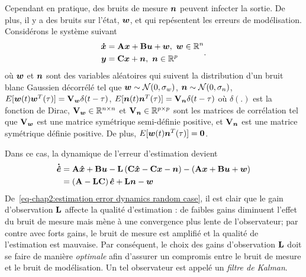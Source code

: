 Cependant en pratique, des bruits de mesure $\bm{n}$ peuvent infecter la sortie. De plus, il y a des bruits  sur l'état, $\bm{w}$,  et  qui repésentent les erreurs de modélisation. Considérons le système suivant
\begin{align}\label{eq-chap2:syslin_commande_noise}
	\begin{split}
		\stateDot &= \matriceA\state+\matriceB\command+\modelNoise, \ \modelNoise\inR^n\\
		\out &= \matriceC\state + \measureNoise, \ \measureNoise\inR^{p}
	\end{split}.
\end{align}
où $\bm{w}$ et $\bm{n}$ sont des variables aléatoires qui suivent la distribution d'un bruit blanc Gaussien décorrélé tel que $\bm{w}\sim{\cal N}(0,\sigma_w)$, $\bm{n}\sim{\cal N}(0,\sigma_n)$, $E[\bm{w}(t)\bm{w}^T(\tau)]=\mathbf{V}_{\bm w}\delta(t-\tau)$, $E[\bm{n}(t)\bm{n}^T(\tau)]=\mathbf{V}_{\bm n}\delta(t-\tau)$ où $\delta(.)$ est la fonction de Dirac,  $\mathbf{V}_{\bm w}\in \mathbb{R}^{n\times n}$ et $\mathbf{V}_{\bm n}\in \mathbb{R}^{p\times p}$ sont les matrices de corrélation tel que $\mathbf{V}_{\bm w}$ est une matrice symétrique semi-définie positive, et $\mathbf{V}_{\bm n}$ est une matrice symétrique définie positive. De plus, $E[\bm{w}(t)\bm{n}^T(\tau)]=\mathbf{0}$.

Dans ce cas, la dynamique de l'erreur d'estimation devient
\begin{align}\label{eq-chap2:estimation error dynamics random case}
	\begin{split}
		\bm{\dot{\hat{e}}} &=  \mathbf{A}\bm{\hat{x}}+\mathbf{B}\bm{u}-\mathbf{L}\left(\mathbf{C}\bm{\hat{x}}-\mathbf{C}\bm{x}-\bm{n}\right) - \left(\mathbf{A}\bm{x}+\mathbf{B}\bm{u}+\bm{w}\right)\\
		&=\left(\mathbf{A}-\mathbf{L}\mathbf{C}\right)\bm{\hat{e}} + \mathbf{L}\bm{n}-\bm{w}
	\end{split}
\end{align}
De~\eqref{eq-chap2:estimation error dynamics random case}, il est clair que le gain d'observation $\mathbf{L}$ affecte la qualité d'estimation : de faibles gains diminuent l'effet du bruit de mesure mais mène à une convergence  plus lente de l'observateur; par contre avec forts gains, le bruit de mesure est amplifié et la qualité de l'estimation est mauvaise. 
Par conséquent, le choix des gains d'observation $\mathbf{L}$ doit se faire de manière \emph{optimale} afin d'assurer un compromis entre le bruit de mesure et le bruit de modélisation. Un tel observateur est appelé  un \emph{filtre de Kalman}. 

